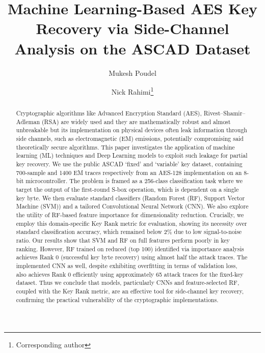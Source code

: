 \documentclass[runningheads]{llncs}
\begin{document}
\title{Machine Learning-Based AES Key Recovery via Side-Channel Analysis on the ASCAD Dataset}

\author{Mukesh Poudel \and Nick Rahimi\thanks{Corresponding author}}

\maketitle

\begin{abstract}
    Cryptographic algorithms like Advanced Encryption Standard (AES), Rivest–Shamir–Adleman (RSA) are widely used and they are mathematically robust and almost unbreakable but its implementation on physical devices often leak information through side channels, such as electromagnetic (EM) emissions, potentially compromising said theoretically secure algorithms. This paper investigates the application of machine learning (ML) techniques and Deep Learning models to exploit such leakage for partial key recovery. We use the public ASCAD `fixed' and `variable' key dataset, containing 700-sample and 1400 EM traces respectively from an AES-128 implementation on an 8-bit microcontroller. The problem is framed as a 256-class classification task where we target the output of the first-round S-box operation, which is dependent on a single key byte. We then evaluate standard classifiers (Random Forest (RF), Support Vector Machine (SVM)) and a tailored Convolutional Neural Network (CNN). We also explore the utility of RF-based feature importance for dimensionality reduction. Crucially, we employ this domain-specific Key Rank metric for evaluation, showing its necessity over standard classification accuracy, which remained below 2\% due to low signal-to-noise ratio. Our results show that SVM and RF on full features perform poorly in key ranking. However, RF trained on reduced (top 100) identified via importance analysis achieves Rank 0 (successful key byte recovery) using almost half the attack traces. The implemented CNN as well, despite exhibiting overfitting in terms of validation loss, also achieves Rank 0 efficiently using approximately 65 attack traces for the fixed-key dataset. Thus we conclude that models, particularly CNNs and feature-selected RF, coupled with the Key Rank metric, are an effective tool for side-channel key recovery, confirming the practical vulnerability of the cryptographic implementations.
\end{abstract}
\end{document}
